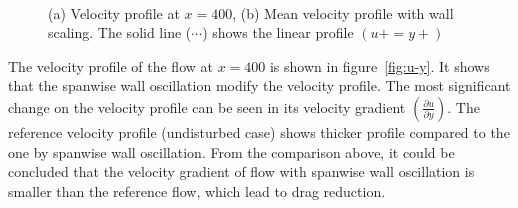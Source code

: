 \begin{figure}[!h]
  \centering
  \\
  \caption{(a) Velocity profile at $x=400$, (b) Mean velocity profile with wall scaling. The solid line ($\cdots$) shows the linear profile $(u+=y+)$}
\end{figure}

The velocity profile of the flow at $x=400$ is shown in figure~\ref{fig:u-y}. It shows that the spanwise wall oscillation modify the velocity profile. The most significant change on the velocity profile can be seen in its velocity gradient $(\frac{\partial u}{\partial y})$. The reference velocity profile (undisturbed case) shows thicker profile compared to the one by spanwise wall oscillation. From the comparison above, it could be concluded that the velocity gradient of flow with spanwise wall oscillation is smaller than the reference flow, which lead to drag reduction. 

